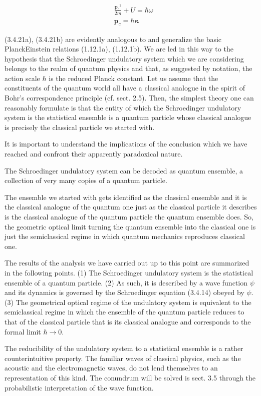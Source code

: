 \documentclass{article}
\begin{document}
\begin{align*}
& \frac{\boldsymbol{p}_{c}{ }^{2}}{2 m}+U=\hbar \omega  \tag{3.4.21a}\\
& \boldsymbol{p}_{c}=\hbar \boldsymbol{\kappa} \tag{3.4.21b}
\end{align*}
 
(3.4.21a), (3.4.21b) are evidently analogous to and generalize the basic PlanckEinstein relations (1.12.1a), (1.12.1b). We are led in this way to the hypothesis that
the Schroedinger undulatory system which we are considering belongs to the realm of quantum physics
and that, as suggested by notation,
the action scale $\hbar$ is the reduced Planck constant.
Let us assume that the constituents of the quantum world all have a classical analogue in the spirit of Bohr's correspondence principle (cf. sect. 2.5). Then, the simplest theory one can reasonably formulate is that
the entity of which the Schroedinger undulatory system is the statistical ensemble is a quantum particle whose classical analogue is precisely the classical particle we started with.

It is important to understand the implications of the conclusion which we have reached and confront their apparently paradoxical nature.

The Schroedinger undulatory system can be decoded as quantum ensemble, a collection of very many copies of a quantum particle.

The ensemble we started with gets identified as the classical ensemble and it is the classical analogue of the quantum one just as the classical particle it describes is the classical analogue of the quantum particle the quantum ensemble does. So, the geometric optical limit turning the quantum ensemble into the classical one is just the semiclassical regime in which quantum mechanics reproduces classical one.

The results of the analysis we have carried out up to this point are summarized in the following points.
(1) The Schroedinger undulatory system is the statistical ensemble of a quantum particle.
(2) As such, it is described by a wave function $\psi$ and its dynamics is governed by the Schroedinger equation (3.4.14) obeyed by $\psi$.
(3) The geometrical optical regime of the undulatory system is equivalent to the semiclassical regime in which the ensemble of the quantum particle reduces to that of the classical particle that is its classical analogue and corresponds to the formal limit $\hbar \rightarrow 0$.

The reducibility of the undulatory system to a statistical ensemble is a rather counterintuitive property. The familiar waves of classical physics, such as the acoustic and the electromagnetic waves, do not lend themselves to an representation of this kind. The conundrum will be solved is sect. 3.5 through the probabilistic interpretation of the wave function.
\end{document}
